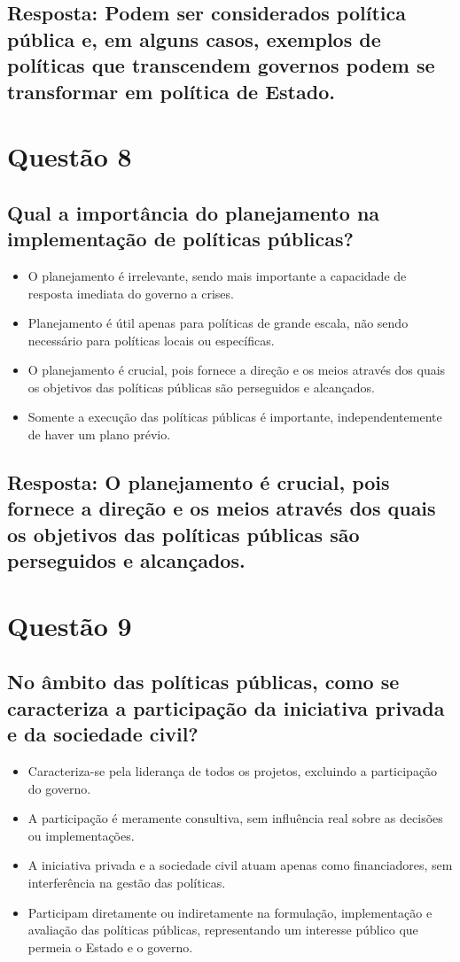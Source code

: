 \documentclass[
   article,       
   12pt,          
   oneside,       
   a4paper,       
   english,       
   brazil,        
   sumario=tradicional
   ]{abntex2}
\begin{document}
\subsection{Resposta: Podem ser considerados política pública e, em alguns casos, exemplos de políticas que transcendem governos podem se transformar em política de Estado.}

\section{Questão 8}
\subsection{Qual a importância do planejamento na implementação de políticas públicas?}
\begin{itemize}
    \item O planejamento é irrelevante, sendo mais importante a capacidade de resposta imediata do governo a crises.
    \item Planejamento é útil apenas para políticas de grande escala, não sendo necessário para políticas locais ou específicas.
    \item O planejamento é crucial, pois fornece a direção e os meios através dos quais os objetivos das políticas públicas são perseguidos e alcançados.
    \item Somente a execução das políticas públicas é importante, independentemente de haver um plano prévio.
\end{itemize}
\subsection{Resposta: O planejamento é crucial, pois fornece a direção e os meios através dos quais os objetivos das políticas públicas são perseguidos e alcançados.}

\section{Questão 9}
\subsection{No âmbito das políticas públicas, como se caracteriza a participação da iniciativa privada e da sociedade civil?}
\begin{itemize}
    \item Caracteriza-se pela liderança de todos os projetos, excluindo a participação do governo.
    \item A participação é meramente consultiva, sem influência real sobre as decisões ou implementações.
    \item A iniciativa privada e a sociedade civil atuam apenas como financiadores, sem interferência na gestão das políticas.
    \item Participam diretamente ou indiretamente na formulação, implementação e avaliação das políticas públicas, representando um interesse público que permeia o Estado e o governo.
\end{itemize}
\end{document}
